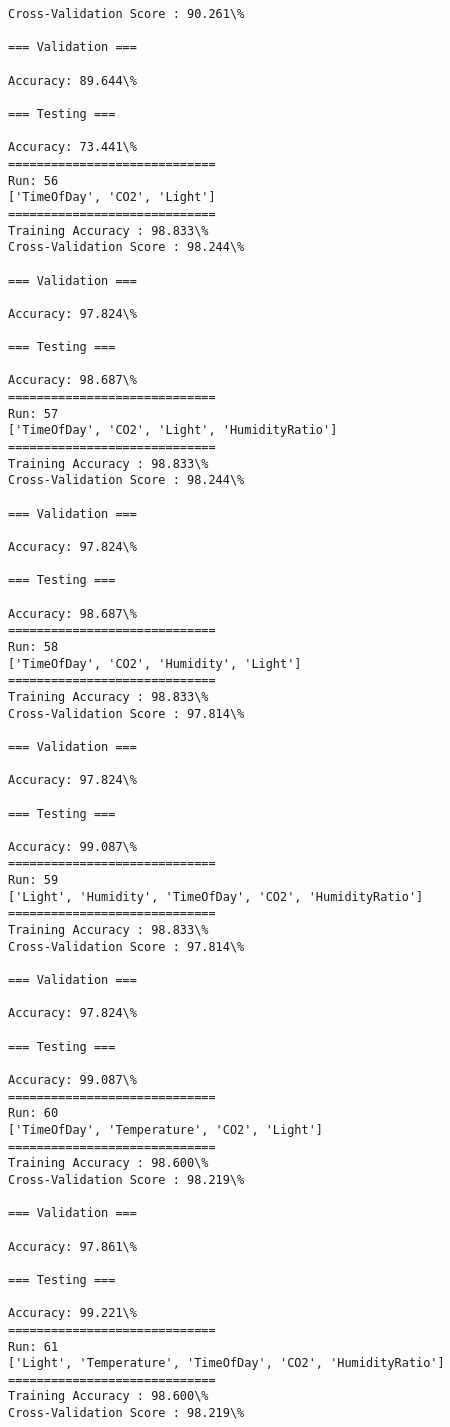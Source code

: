 \documentclass[11pt]{article}
\begin{document}
    \begin{Verbatim}[commandchars=\\\{\}]
Cross-Validation Score : 90.261\%

=== Validation ===

Accuracy: 89.644\%

=== Testing ===

Accuracy: 73.441\%
=============================
Run: 56
['TimeOfDay', 'CO2', 'Light']
=============================
Training Accuracy : 98.833\%
Cross-Validation Score : 98.244\%

=== Validation ===

Accuracy: 97.824\%

=== Testing ===

Accuracy: 98.687\%
=============================
Run: 57
['TimeOfDay', 'CO2', 'Light', 'HumidityRatio']
=============================
Training Accuracy : 98.833\%
Cross-Validation Score : 98.244\%

=== Validation ===

Accuracy: 97.824\%

=== Testing ===

Accuracy: 98.687\%
=============================
Run: 58
['TimeOfDay', 'CO2', 'Humidity', 'Light']
=============================
Training Accuracy : 98.833\%
Cross-Validation Score : 97.814\%

=== Validation ===

Accuracy: 97.824\%

=== Testing ===

Accuracy: 99.087\%
=============================
Run: 59
['Light', 'Humidity', 'TimeOfDay', 'CO2', 'HumidityRatio']
=============================
Training Accuracy : 98.833\%
Cross-Validation Score : 97.814\%

=== Validation ===

Accuracy: 97.824\%

=== Testing ===

Accuracy: 99.087\%
=============================
Run: 60
['TimeOfDay', 'Temperature', 'CO2', 'Light']
=============================
Training Accuracy : 98.600\%
Cross-Validation Score : 98.219\%

=== Validation ===

Accuracy: 97.861\%

=== Testing ===

Accuracy: 99.221\%
=============================
Run: 61
['Light', 'Temperature', 'TimeOfDay', 'CO2', 'HumidityRatio']
=============================
Training Accuracy : 98.600\%
Cross-Validation Score : 98.219\%


\end{Verbatim}
\end{document}
